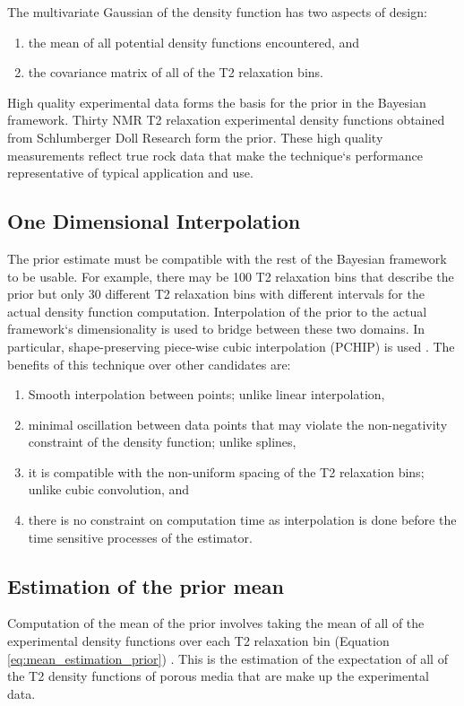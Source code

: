 The multivariate Gaussian of the density function has two aspects of design:
\begin{enumerate}
    \item the mean of all potential density functions encountered, and
    \item the covariance matrix of all of the T2 relaxation bins.
\end{enumerate}

High quality experimental data forms the basis for the prior in the Bayesian framework. Thirty NMR T2 relaxation experimental density functions obtained from Schlumberger Doll Research form the prior. These high quality measurements reflect true rock data that make the technique`s performance representative of typical application and use. 


\subsection{One Dimensional Interpolation} \label{section:oneDimInterpolation}
The prior estimate must be compatible with the rest of the Bayesian framework to be usable. For example, there may be 100 T2 relaxation bins that describe the prior but only 30 different T2 relaxation bins with different intervals for the actual density function computation. Interpolation of the prior to the actual framework`s dimensionality is used to bridge between these two domains. In particular, shape-preserving piece-wise cubic interpolation (PCHIP) is used \cite{fritsch1980monotone}. The benefits of this technique over other candidates are:

\begin{enumerate}
    \item Smooth interpolation between points; unlike linear interpolation, 
    \item minimal oscillation between data points that may violate the non-negativity constraint of the density function; unlike splines, 
    \item it is compatible with the non-uniform spacing of the T2 relaxation bins; unlike cubic convolution, and
    \item there is no constraint on computation time as interpolation is done before the time sensitive processes of the estimator. 
\end{enumerate}




\subsection{Estimation of the prior mean}
\label{section:estPriorMean}
Computation of the mean of the prior involves taking the mean of all of the experimental density functions over each T2 relaxation bin (Equation \ref{eq:mean_estimation_prior}) \cite{DiscreteRandomSignalsBookCovarianceEst}. This is the estimation of the expectation of all of the T2 density functions of porous media that are make up the experimental data.

